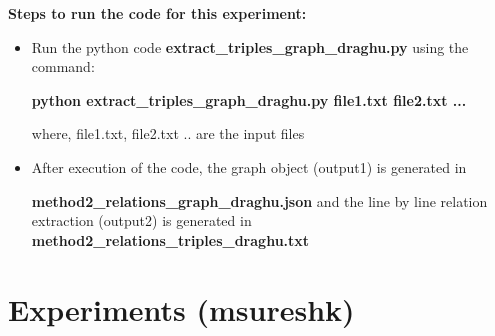 \documentclass[11pt,letterpaper]{article}
\begin{document}
\noindent \newline
\textbf{Steps to run the code for this experiment:}
\begin{itemize}
    \item Run the python code \textbf{extract\_triples\_graph\_draghu.py} using the command:
    
    \textbf{python extract\_triples\_graph\_draghu.py file1.txt file2.txt ...}
    
    where, file1.txt, file2.txt .. are the input files
    
    \item After execution of the code, the graph object (output1) is generated in
    
    \textbf{method2\_relations\_graph\_draghu.json} and the line by line relation extraction (output2) is generated in \textbf{method2\_relations\_triples\_draghu.txt}
\end{itemize}
\newpage
\section{Experiments (msureshk)}
\end{document}
